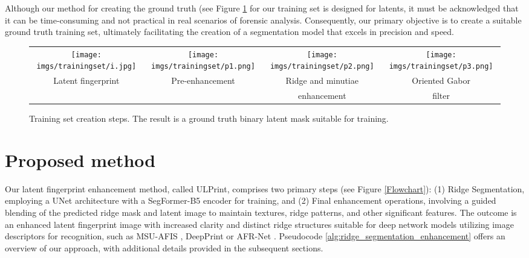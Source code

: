 \documentclass[twocolumn, switch]{article} %
\begin{document}
Although our method for creating the ground truth (see Figure \ref{traincreation} for our training set is designed for latents, it must be acknowledged that it can be time-consuming and not practical in real scenarios of forensic analysis. Consequently, our primary objective is to create a suitable ground truth training set, ultimately facilitating the creation of a segmentation model that excels in precision and speed.

\begin{figure}[H]
\centering
\renewcommand{\arraystretch}{0.5}
\setlength{\tabcolsep}{1pt}
\begin{tabular}{cccc}

\texttt{[image: imgs/trainingset/i.jpg]}&
\texttt{[image: imgs/trainingset/p1.png]}&
\texttt{[image: imgs/trainingset/p2.png]}&
\texttt{[image: imgs/trainingset/p3.png]}
\\
\scriptsize Latent fingerprint & \scriptsize Pre-enhancement & \scriptsize Ridge and minutiae & \scriptsize Oriented Gabor\newline \\ & & \scriptsize enhancement & \scriptsize filter

\end{tabular}
\caption{Training set creation steps. The result is a ground truth binary latent mask suitable for training.}
\label{traincreation}
\end{figure}




\section{Proposed method}

Our latent fingerprint enhancement method, called ULPrint, comprises two primary steps (see Figure \ref{Flowchart}): (1) Ridge Segmentation, employing a UNet architecture with a SegFormer-B5 encoder \cite{DBLP:journals/corr/abs-2105-15203} for training, and (2) Final enhancement operations, involving a guided blending of the predicted ridge mask and latent image to maintain textures, ridge patterns, and other significant features. The outcome is an enhanced latent fingerprint image with increased clarity and distinct ridge structures suitable for deep network models utilizing image descriptors for recognition, such as MSU-AFIS \cite{cao2018end}, DeepPrint \cite{engelsma2019learning} or AFR-Net \cite{grosz2022afrnet}. Pseudocode \ref{alg:ridge_segmentation_enhancement} offers an overview of our approach, with additional details provided in the subsequent sections.
\end{document}
